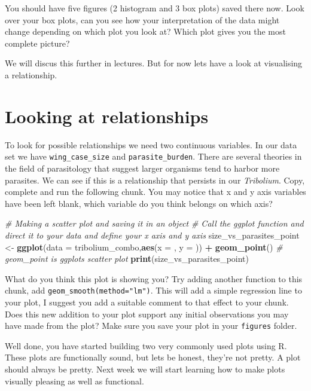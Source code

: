 \documentclass[
]{book}
\newenvironment{Shaded}{\begin{snugshade}}{\end{snugshade}}
\newcommand{\AttributeTok}[1]{\textcolor[rgb]{0.13,0.29,0.53}{#1}}
\newcommand{\CommentTok}[1]{\textcolor[rgb]{0.56,0.35,0.01}{\textit{#1}}}
\newcommand{\FunctionTok}[1]{\textcolor[rgb]{0.13,0.29,0.53}{\textbf{#1}}}
\newcommand{\NormalTok}[1]{#1}
\newcommand{\OtherTok}[1]{\textcolor[rgb]{0.56,0.35,0.01}{#1}}
\newcommand{\SpecialCharTok}[1]{\textcolor[rgb]{0.81,0.36,0.00}{\textbf{#1}}}
\begin{document}
You should have five figures (2 histogram and 3 box plots) saved there now. Look over your box plots, can you see how your interpretation of the data might change depending on which plot you look at? Which plot gives you the most complete picture?

We will discus this further in lectures. But for now lets have a look at visualising a relationship.

\hypertarget{scatter}{%
\section{Looking at relationships}\label{scatter}}

To look for possible relationships we need two continuous variables. In our data set we have \texttt{wing\_case\_size} and \texttt{parasite\_burden}. There are several theories in the field of parasitology that suggest larger organisms tend to harbor more parasites. We can see if this is a relationship that persists in our \emph{Tribolium}. Copy, complete and run the following chunk. You may notice that x and y axis variables have been left blank, which variable do you think belongs on which axis?

\begin{Shaded}
\begin{Highlighting}[]
\CommentTok{\# Making a scatter plot and saving it in an object}
\CommentTok{\# Call the ggplot function and direct it to your data and define your x axis and y axis}
\NormalTok{size\_vs\_parasites\_point }\OtherTok{\textless{}{-}} \FunctionTok{ggplot}\NormalTok{(}\AttributeTok{data =}\NormalTok{ tribolium\_combo,}\FunctionTok{aes}\NormalTok{(}\AttributeTok{x =}\NormalTok{ , }\AttributeTok{y =}\NormalTok{ )) }\SpecialCharTok{+} 
  \FunctionTok{geom\_point}\NormalTok{() }\CommentTok{\# geom\_point is ggplots scatter plot}
\FunctionTok{print}\NormalTok{(size\_vs\_parasites\_point)}
\end{Highlighting}
\end{Shaded}

What do you think this plot is showing you? Try adding another function to this chunk, add \texttt{geom\_smooth(method="lm")}. This will add a simple regression line to your plot, I suggest you add a suitable comment to that effect to your chunk. Does this new addition to your plot support any initial observations you may have made from the plot? Make sure you save your plot in your \texttt{figures} folder.

Well done, you have started building two very commonly used plots using R. These plots are functionally sound, but lets be honest, they're not pretty. A plot should always be pretty. Next week we will start learning how to make plots visually pleasing as well as functional.
\end{document}
